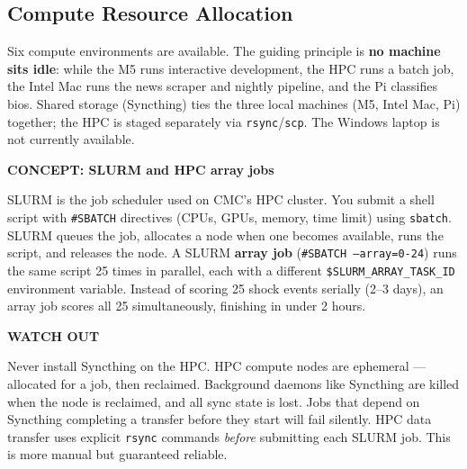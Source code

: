 \documentclass[11pt]{article}
\newcommand{\concept}[2]{%
  \begin{mdframed}[style=conceptbox]
  {\small\bfseries\color{bluefg}CONCEPT: #1}\par\smallskip #2
  \end{mdframed}}
\newcommand{\warnbox}[1]{%
  \begin{mdframed}[style=warnbox]
  {\small\bfseries\color{amberfg}WATCH OUT}\par\smallskip #1
  \end{mdframed}}
\begin{document}
\subsection*{Compute Resource Allocation}

Six compute environments are available. The guiding principle is \textbf{no machine sits idle}: while the M5 runs interactive development, the HPC runs a batch job, the Intel Mac runs the news scraper and nightly pipeline, and the Pi classifies bios. Shared storage (Syncthing) ties the three local machines (M5, Intel Mac, Pi) together; the HPC is staged separately via \texttt{rsync}/\texttt{scp}. The Windows laptop is not currently available.

\concept{SLURM and HPC array jobs}{
SLURM is the job scheduler used on CMC's HPC cluster. You submit a shell script
with \texttt{\#SBATCH} directives (CPUs, GPUs, memory, time limit) using
\texttt{sbatch}. SLURM queues the job, allocates a node when one becomes available,
runs the script, and releases the node. A SLURM \textbf{array job}
(\texttt{\#SBATCH --array=0-24}) runs the same script 25 times in parallel, each
with a different \texttt{\$SLURM\_ARRAY\_TASK\_ID} environment variable. Instead of
scoring 25 shock events serially (2--3 days), an array job scores all 25
simultaneously, finishing in under 2 hours.
}

\warnbox{
Never install Syncthing on the HPC. HPC compute nodes are ephemeral --- allocated
for a job, then reclaimed. Background daemons like Syncthing are killed when the
node is reclaimed, and all sync state is lost. Jobs that depend on Syncthing
completing a transfer before they start will fail silently. HPC data transfer uses
explicit \texttt{rsync} commands \emph{before} submitting each SLURM job. This is
more manual but guaranteed reliable.
}
\end{document}
